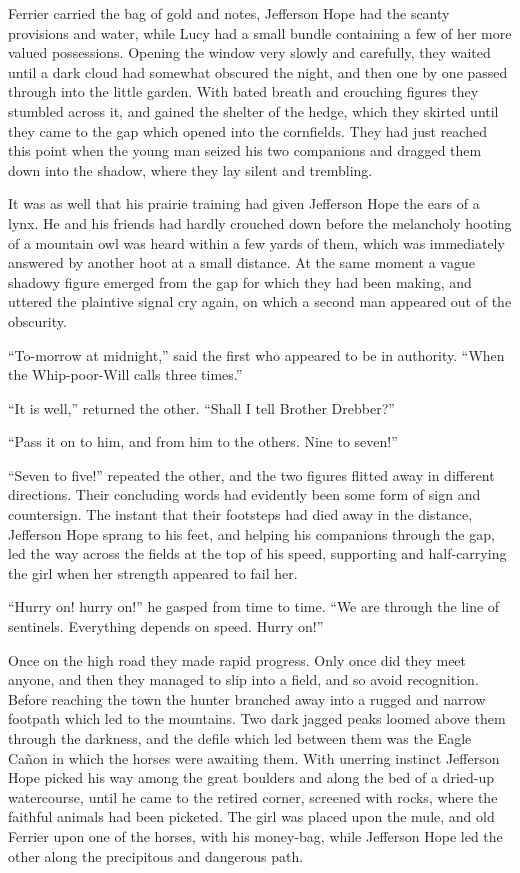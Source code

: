 \documentclass[12pt]{book}
\begin{document}
Ferrier carried the bag of gold and notes, Jefferson Hope had the scanty provisions and water, while Lucy had a small bundle containing a few of her more valued possessions. Opening the window very slowly and carefully, they waited until a dark cloud had somewhat obscured the night, and then one by one passed through into the little garden. With bated breath and crouching figures they stumbled across it, and gained the shelter of the hedge, which they skirted until they came to the gap which opened into the cornfields. They had just reached this point when the young man seized his two companions and dragged them down into the shadow, where they lay silent and trembling. 

It was as well that his prairie training had given Jefferson Hope the ears of a lynx. He and his friends had hardly crouched down before the melancholy hooting of a mountain owl was heard within a few yards of them, which was immediately answered by another hoot at a small distance. At the same moment a vague shadowy figure emerged from the gap for which they had been making, and uttered the plaintive signal cry again, on which a second man appeared out of the obscurity. 

“To-morrow at midnight,” said the first who appeared to be in authority. “When the Whip-poor-Will calls three times.” 

“It is well,” returned the other. “Shall I tell Brother Drebber?” 

“Pass it on to him, and from him to the others. Nine to seven!” 

“Seven to five!” repeated the other, and the two figures flitted away in different directions. Their concluding words had evidently been some form of sign and countersign. The instant that their footsteps had died away in the distance, Jefferson Hope sprang to his feet, and helping his companions through the gap, led the way across the fields at the top of his speed, supporting and half-carrying the girl when her strength appeared to fail her. 

“Hurry on! hurry on!” he gasped from time to time. “We are through the line of sentinels. Everything depends on speed. Hurry on!” 

Once on the high road they made rapid progress. Only once did they meet anyone, and then they managed to slip into a field, and so avoid recognition. Before reaching the town the hunter branched away into a rugged and narrow footpath which led to the mountains. Two dark jagged peaks loomed above them through the darkness, and the defile which led between them was the Eagle Cañon in which the horses were awaiting them. With unerring instinct Jefferson Hope picked his way among the great boulders and along the bed of a dried-up watercourse, until he came to the retired corner, screened with rocks, where the faithful animals had been picketed. The girl was placed upon the mule, and old Ferrier upon one of the horses, with his money-bag, while Jefferson Hope led the other along the precipitous and dangerous path. 
\end{document}
